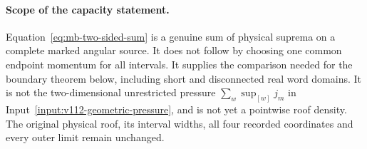 \paragraph{Scope of the capacity statement.}
Equation~\eqref{eq:mb-two-sided-sum} is a genuine sum of physical
suprema on a complete marked angular source.  It does not follow
by choosing one common endpoint momentum for all intervals.
It supplies the comparison needed for the boundary theorem below,
including short and disconnected real word domains.
It is not the two-dimensional unrestricted pressure
$\sum_w\sup_{[w]}j_m$ in
Input~\ref{input:v112-geometric-pressure}, and is not yet a
pointwise roof density.  The original physical roof, its interval
widths, all four recorded coordinates and every outer limit remain
unchanged.
